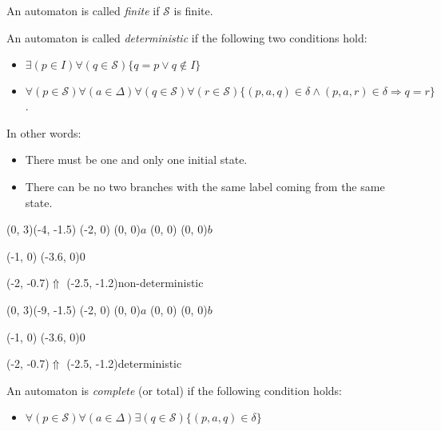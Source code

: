 \documentclass{article}
\begin{document}
\begin{definition}[Finiteness] \label{def:finiteness}
An automaton is called \emph{finite} if $\mathcal{S}$ is finite.
\end{definition}

\begin{definition}[Determinism] \label{def:determinism}
An automaton is called \emph{deterministic} if the following two conditions 
hold:
\begin{itemize}
\item $\exists (p \in I) \forall (q  \in \mathcal{S})
\{q = p \lor q \notin I\}$
\item $\forall (p \in \mathcal{S}) \forall (a \in \Delta)
\forall (q \in \mathcal{S}) \forall (r \in \mathcal{S})
\{(p, a, q) \in \delta \land (p, a, r) \in \delta \Rightarrow q = r\}$.
\end{itemize}
\end{definition}

In other words:
\begin{itemize}
\item There must be one and only one initial state.
\item There can be no two branches with the same label coming from the same 
  state.
\end{itemize}
\begin{graph}(0, 3)(-4, -1.5)
  (-2, 0) (0, 0){$a$}
  (0, 0) (0, 0){$b$}

  (-1, 0) \freetext(-3.6, 0){0}
   

  \freetext(-2, -0.7){$\Uparrow$}
  \freetext(-2.5, -1.2){non-deterministic}
\end{graph}
\begin{graph}(0, 3)(-9, -1.5)
  (-2, 0) (0, 0){$a$}
  (0, 0) (0, 0){$b$}

  (-1, 0) \freetext(-3.6, 0){0}
   

  \freetext(-2, -0.7){$\Uparrow$}
  \freetext(-2.5, -1.2){deterministic}
\end{graph}

\begin{definition}[Completeness] \label{def:completeness}
An automaton is \emph{complete} (or total) if the following condition holds:
\begin{itemize}
\item $\forall (p \in \mathcal{S}) \forall (a \in \Delta)
\exists (q \in \mathcal{S}) \{(p, a, q) \in \delta\}$
\end{itemize}
\end{definition}
\end{document}

